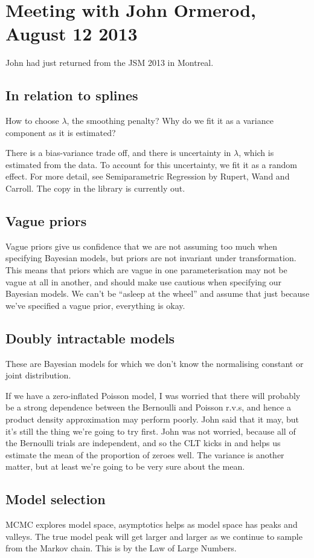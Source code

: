 \documentclass{amsart}
\begin{document}
\section{Meeting with John Ormerod, August 12 2013}
John had just returned from the JSM 2013 in Montreal.

\subsection{In relation to splines}
How to choose $\lambda$, the smoothing penalty? Why do we fit it as a variance
component as it is estimated?

There is a bias-variance trade off, and there is uncertainty in $\lambda$, which
is estimated from the data. To account for this uncertainty, we fit it as a
random effect. For more detail, see Semiparametric Regression by Rupert, Wand
and Carroll. The copy in the library is currently out.

\subsection{Vague priors}
Vague priors give us confidence that we are not assuming too much when
specifying Bayesian models, but priors are not invariant under transformation.
This means that priors which are vague in one parameterisation may not be vague
at all in another, and should make use cautious when specifying our Bayesian
models. We can't be ``asleep at the wheel'' and assume that just because we've
specified a vague prior, everything is okay.

\subsection{Doubly intractable models}
These are Bayesian models for which we don't know the normalising constant or
joint distribution.

If we have a zero-inflated Poisson model, I was worried that there will probably
be a strong dependence between the Bernoulli and Poisson r.v.s, and hence a
product density approximation may perform poorly. John said that it may, but it's
still the thing we're going to try first. John was not worried, because all of the
Bernoulli trials are independent, and so the CLT kicks in and helps us estimate
the mean of the proportion of zeroes well. The variance is another matter, but at
least we're going to be very sure about the mean.

\subsection{Model selection}
MCMC explores model space, asymptotics helps as model space has peaks and
valleys. The true model peak will get larger and larger as we continue to
sample from the Markov chain. This is by the Law of Large Numbers.
\end{document}
